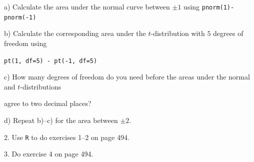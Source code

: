 \documentclass[10pt]{article}
\begin{document}
\hspace{20pt} a) Calculate the area under the normal curve between 
  $\pm 1$  using \lstinline!pnorm(1)-pnorm(-1)!
\bigskip

\hspace{20pt} b) Calculate the corresponding area under the $t$-distribution with 
$5$ degrees of freedom using\vspace{-4pt}

\HH \lstinline!pt(1, df=5) - pt(-1, df=5)!
\bigskip

\hspace{20pt} c) How many degrees of freedom do you need before the areas 
  under the normal and $t$-distributions\vspace{-4pt}

\HH agree to two decimal places?
\bigskip

\hspace{20pt} d) Repeat b)--c) for the area between $\pm 2$.
\bigskip

2. Use \texttt{R} to do exercises 1--2 on page 494.
\vspace{1.5in}

3. Do exercise 4 on page 494.
\vfill
\eject
\end{document}
